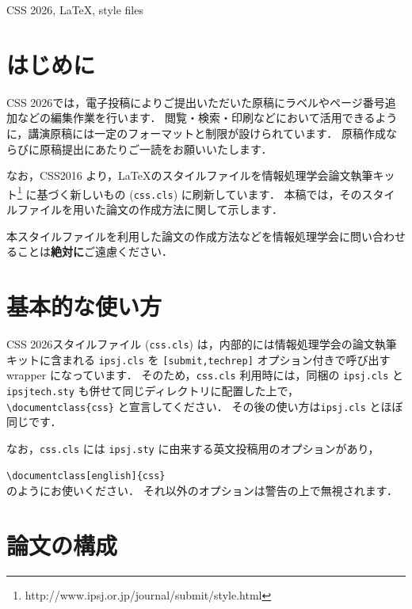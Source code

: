 \documentclass{css}
\def\|{\verb|}
\newcommand{\cssname}[0]{CSS 2026}
\begin{document}
\begin{ekeyword}
\cssname, \LaTeX, style files
\end{ekeyword}

%% if you use english opsion, you should put your English abstract in the abstract environment.
%% eabstract is not displayed in english mode.

\maketitle

%1
\section{はじめに}

\cssname では，電子投稿によりご提出いただいた原稿にラベルやページ番号追加などの編集作業を行います．
閲覧・検索・印刷などにおいて活用できるように，講演原稿には一定のフォーマットと制限が設けられています．
原稿作成ならびに原稿提出にあたりご一読をお願いいたします．

なお，CSS2016 より，\LaTeX のスタイルファイルを情報処理学会論文執筆キット\footnote{http://www.ipsj.or.jp/journal/submit/style.html} に基づく新しいもの (\|css.cls|) に刷新しています．
本稿では，そのスタイルファイルを用いた論文の作成方法に関して示します．

本スタイルファイルを利用した論文の作成方法などを情報処理学会に問い合わせることは\textbf{絶対に}ご遠慮ください．

\section{基本的な使い方}

\cssname スタイルファイル (\|css.cls|) は，内部的には情報処理学会の論文執筆キットに含まれる \|ipsj.cls| を \|[submit,techrep]| オプション付きで呼び出す wrapper になっています．
そのため，\|css.cls| 利用時には，同梱の \|ipsj.cls| と \|ipsjtech.sty| も併せて同じディレクトリに配置した上で，\|\documentclass{css}| と宣言してください．
その後の使い方は\|ipsj.cls| とほぼ同じです．

なお，\|css.cls| には \|ipsj.sty| に由来する英文投稿用のオプションがあり，

\noindent
\|\documentclass[english]{css} |\\
のようにお使いください．
それ以外のオプションは警告の上で無視されます．

\section{論文の構成}
\end{document}

